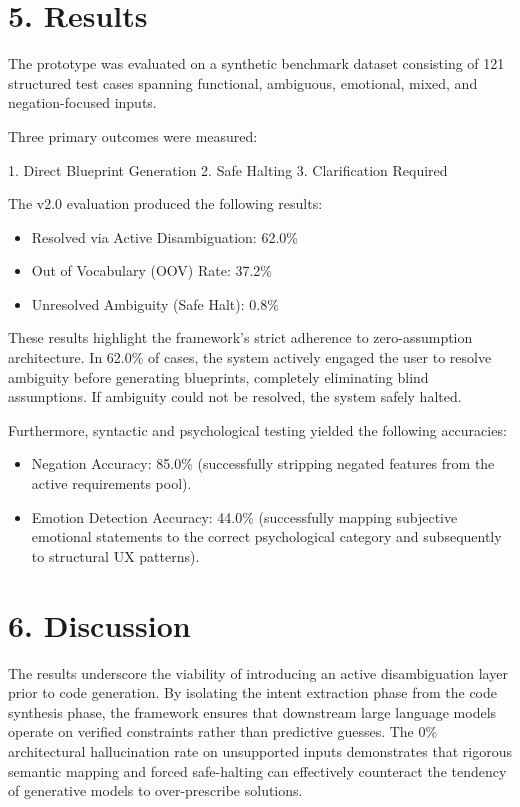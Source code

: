 \documentclass[11pt,a4paper]{article}
\begin{document}
\section{5. Results}

The prototype was evaluated on a synthetic benchmark dataset consisting of 121 structured test cases spanning functional, ambiguous, emotional, mixed, and negation-focused inputs.

Three primary outcomes were measured:

1. Direct Blueprint Generation
2. Safe Halting
3. Clarification Required

The v2.0 evaluation produced the following results:

\begin{itemize}
    \item Resolved via Active Disambiguation: 62.0\%
    \item Out of Vocabulary (OOV) Rate: 37.2\%
    \item Unresolved Ambiguity (Safe Halt): 0.8\%
\end{itemize}

These results highlight the framework's strict adherence to zero-assumption architecture. In 62.0\% of cases, the system actively engaged the user to resolve ambiguity before generating blueprints, completely eliminating blind assumptions. If ambiguity could not be resolved, the system safely halted.

Furthermore, syntactic and psychological testing yielded the following accuracies:
\begin{itemize}
    \item Negation Accuracy: 85.0\% (successfully stripping negated features from the active requirements pool).
    \item Emotion Detection Accuracy: 44.0\% (successfully mapping subjective emotional statements to the correct psychological category and subsequently to structural UX patterns).
\end{itemize}



\section{6. Discussion}

The results underscore the viability of introducing an active disambiguation layer prior to code generation. By isolating the intent extraction phase from the code synthesis phase, the framework ensures that downstream large language models operate on verified constraints rather than predictive guesses. The 0\% architectural hallucination rate on unsupported inputs demonstrates that rigorous semantic mapping and forced safe-halting can effectively counteract the tendency of generative models to over-prescribe solutions.
\end{document}

